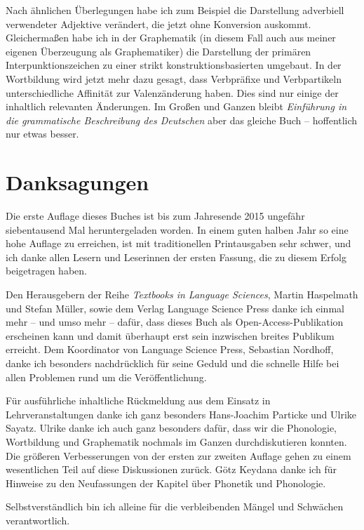 Nach ähnlichen Überlegungen habe ich zum Beispiel die Darstellung adverbiell verwendeter Adjektive verändert, die jetzt ohne Konversion auskommt.
Gleichermaßen habe ich in der Graphematik (in diesem Fall auch aus meiner eigenen Überzeugung als Graphematiker) die Darstellung der primären Interpunktionszeichen zu einer strikt konstruktionsbasierten umgebaut.
In der Wortbildung wird jetzt mehr dazu gesagt, dass Verbpräfixe und Verbpartikeln unterschiedliche Affinität zur Valenzänderung haben.
Dies sind nur einige der inhaltlich relevanten Änderungen.
Im Großen und Ganzen bleibt \textit{Einführung in die grammatische Beschreibung des Deutschen} aber das gleiche Buch -- hoffentlich nur etwas besser.

\section*{Danksagungen}

Die erste Auflage dieses Buches ist bis zum Jahresende 2015 ungefähr siebentausend Mal heruntergeladen worden.
In einem guten halben Jahr so eine hohe Auflage zu erreichen, ist mit traditionellen Printausgaben sehr schwer, und ich danke allen Lesern und Leserinnen der ersten Fassung, die zu diesem Erfolg beigetragen haben.

Den Herausgebern der Reihe \textit{Textbooks in Language Sciences}, Martin Haspelmath und Stefan Müller, sowie dem Verlag Language Science Press danke ich einmal mehr -- und umso mehr -- dafür, dass dieses Buch als Open-Access-Publikation erscheinen kann und damit überhaupt erst sein inzwischen breites Publikum erreicht.
Dem Koordinator von Language Science Press, Sebastian Nordhoff, danke ich besonders nachdrücklich für seine Geduld und die schnelle Hilfe bei allen Problemen rund um die Veröffentlichung.

Für ausführliche inhaltliche Rückmeldung aus dem Einsatz in Lehrveranstaltungen danke ich ganz besonders Hans-Joachim Particke und Ulrike Sayatz.
Ulrike danke ich auch ganz besonders dafür, dass wir die Phonologie, Wortbildung und Graphematik nochmals im Ganzen durchdiskutieren konnten.
Die größeren Verbesserungen von der ersten zur zweiten Auflage gehen zu einem wesentlichen Teil auf diese Diskussionen zurück.
Götz Keydana danke ich für Hinweise zu den Neufassungen der Kapitel über Phonetik und Phonologie.

Selbstverständlich bin ich alleine für die verbleibenden Mängel und Schwächen verantwortlich.
